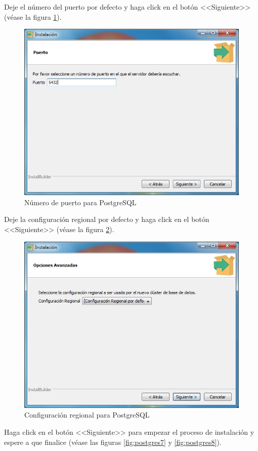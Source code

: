 \newpage

Deje el n\'{u}mero del puerto por defecto y haga click en el bot\'{o}n <<Siguiente>> (v\'{e}ase la figura \ref{fig:postgres5}).

\begin{figure}[H]
  \centering
  \includegraphics[width=.6\linewidth]{./img/postgres5.jpg}
\caption[]{N\'{u}mero de puerto para PostgreSQL\label{fig:postgres5}}
\end{figure}

Deje la configuraci\'{o}n regional por defecto y haga click en el bot\'{o}n <<Siguiente>> (v\'{e}ase la figura \ref{fig:postgres6}).

\begin{figure}[H]
  \centering
  \includegraphics[width=.6\linewidth]{./img/postgres6.jpg}
\caption[]{Configuraci\'{o}n regional para PostgreSQL\label{fig:postgres6}}
\end{figure}

\newpage

Haga click en el bot\'{o}n <<Siguiente>> para empezar el proceso de instalaci\'{o}n y espere a que finalice (v\'{e}ase las figuras \ref{fig:postgres7} y \ref{fig:postgres8}).

